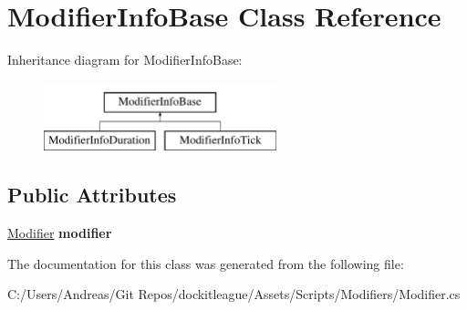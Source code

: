 \hypertarget{class_modifier_info_base}{}\section{Modifier\+Info\+Base Class Reference}
\label{class_modifier_info_base}
Inheritance diagram for Modifier\+Info\+Base\+:\begin{figure}[H]
\begin{center}
\leavevmode
\includegraphics[height=2.000000cm]{class_modifier_info_base}
\end{center}
\end{figure}
\subsection*{Public Attributes}
\begin{DoxyCompactItemize}
\item 
\hypertarget{class_modifier_info_base_a3c559418890512f9626a735ee995cb92}{}\label{class_modifier_info_base_a3c559418890512f9626a735ee995cb92} 
\hyperlink{class_modifier}{Modifier} {\bfseries modifier}
\end{DoxyCompactItemize}


The documentation for this class was generated from the following file\+:\begin{DoxyCompactItemize}
\item 
C\+:/\+Users/\+Andreas/\+Git Repos/dockitleague/\+Assets/\+Scripts/\+Modifiers/Modifier.\+cs\end{DoxyCompactItemize}
